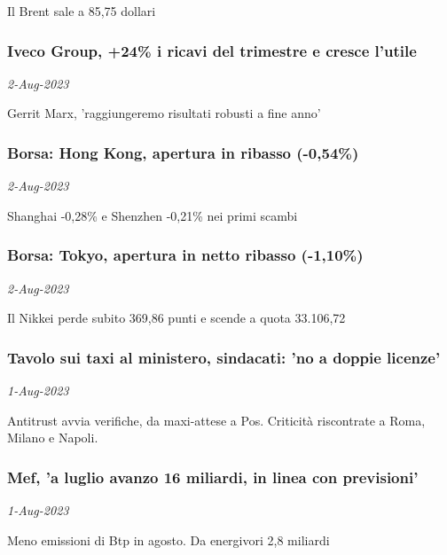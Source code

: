 Il Brent sale a 85,75 dollari
\subsubsection{Iveco Group, +24\% i ricavi del trimestre e cresce l'utile \href{https://www.ansa.it/sito/notizie/economia/2023/08/02/iveco-group-24-i-ricavi-del-trimestre-e-cresce-lutile_d8e1b73b-d928-4bac-9ae2-66c81a61532e.html}{}}
\textit{2-Aug-2023}

Gerrit Marx, 'raggiungeremo risultati robusti a fine anno'
\subsubsection{Borsa: Hong Kong, apertura in ribasso (-0,54\%) \href{https://www.ansa.it/sito/notizie/economia/2023/08/02/borsa-hong-kong-apertura-in-ribasso-054_92fb3a5a-0a1e-40b1-861c-459ec0ab8f9f.html}{}}
\textit{2-Aug-2023}

Shanghai -0,28\% e Shenzhen -0,21\% nei primi scambi
\subsubsection{Borsa: Tokyo, apertura in netto ribasso (-1,10\%) \href{https://www.ansa.it/sito/notizie/economia/2023/08/02/borsa-tokyo-apertura-in-netto-ribasso-110_f14e959d-b642-47bb-87f0-2db2deee9266.html}{}}
\textit{2-Aug-2023}

Il Nikkei perde subito 369,86 punti e scende a quota 33.106,72
\subsubsection{Tavolo sui taxi al ministero, sindacati: 'no a doppie licenze' \href{https://www.ansa.it/sito/notizie/economia/2023/08/01/tavolo-sui-taxi-al-ministero-sindacati-no-a-doppie-licenze_3f336a58-d84c-4f9d-8968-fa06a75becab.html}{}}
\textit{1-Aug-2023}

Antitrust avvia verifiche, da maxi-attese a Pos. Criticit\`{a} riscontrate a Roma, Milano e Napoli.
\subsubsection{Mef, 'a luglio avanzo 16 miliardi, in linea con previsioni' \href{https://www.ansa.it/sito/notizie/economia/2023/08/01/mef-a-luglio-avanzo-16-miliardi-in-linea-con-previsioni_aaa59192-4410-453d-9647-ddbcd8a51400.html}{}}
\textit{1-Aug-2023}

Meno emissioni di Btp in agosto. Da energivori 2,8 miliardi
